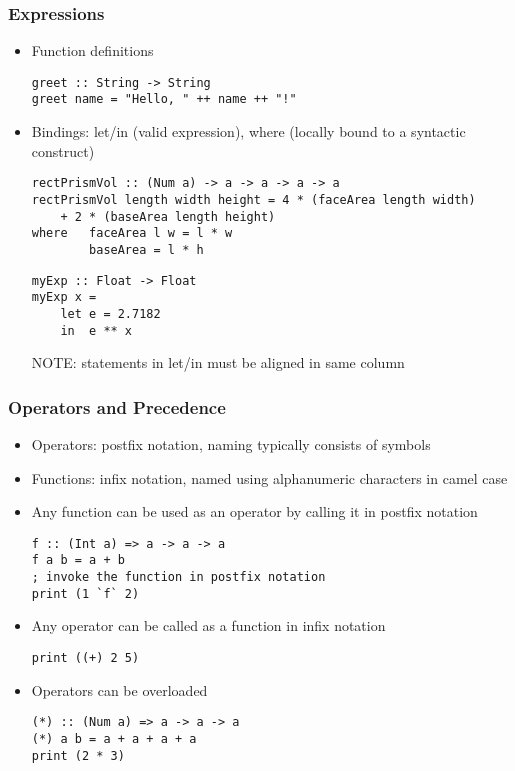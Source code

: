 \documentclass[titlepage,12pt]{article}
\newcommand{\bi}{\begin{itemize}}
\newcommand{\ei}{\end{itemize}}
\begin{document}
\subsubsection{Expressions}
\bi
    \item Function definitions
\begin{verbatim}
greet :: String -> String
greet name = "Hello, " ++ name ++ "!"
\end{verbatim}
    \item Bindings: let/in (valid expression), where (locally bound to a syntactic construct)
\begin{verbatim}
rectPrismVol :: (Num a) -> a -> a -> a -> a
rectPrismVol length width height = 4 * (faceArea length width)
    + 2 * (baseArea length height)
where   faceArea l w = l * w
        baseArea = l * h
\end{verbatim}
\begin{verbatim}
myExp :: Float -> Float
myExp x =
    let e = 2.7182
    in  e ** x
\end{verbatim}
NOTE: statements in let/in must be aligned in same column
\ei

\subsubsection{Operators and Precedence}
\bi
    \item Operators: postfix notation, naming typically consists of symbols
    \item Functions: infix notation, named using alphanumeric characters in camel case
    \item Any function can be used as an operator by calling it in postfix notation
\begin{verbatim}
f :: (Int a) => a -> a -> a
f a b = a + b
; invoke the function in postfix notation
print (1 `f` 2)
\end{verbatim}
    \item Any operator can be called as a function in infix notation
\begin{verbatim}
print ((+) 2 5)
\end{verbatim}
    \item Operators can be overloaded
\begin{verbatim}
(*) :: (Num a) => a -> a -> a
(*) a b = a + a + a + a
print (2 * 3)
\end{verbatim}
\ei
\end{document}
